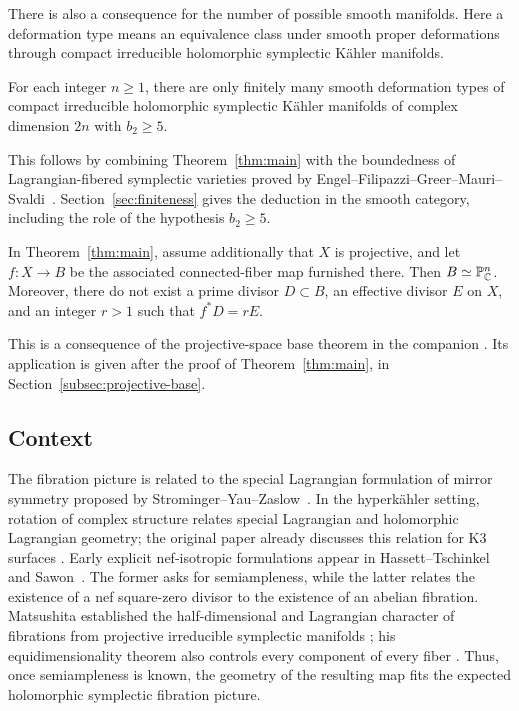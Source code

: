 There is also a consequence for the number of possible smooth
manifolds. Here a deformation type means an equivalence class
under smooth proper deformations through compact irreducible
holomorphic symplectic K\"ahler manifolds.

\begin{corollary}\label{cor:finiteness}
For each integer $n\ge1$, there are only finitely many smooth
deformation types of compact irreducible holomorphic symplectic
K\"ahler manifolds of complex dimension $2n$ with $b_2\ge5$.
\end{corollary}

This follows by combining Theorem~\ref{thm:main} with the boundedness
of Lagrangian-fibered symplectic varieties proved by
Engel--Filipazzi--Greer--Mauri--Svaldi~\cite{EFGMS}.
Section~\ref{sec:finiteness} gives the deduction in the smooth
category, including the role of the hypothesis $b_2\ge5$.

\begin{corollary}\label{cor:projective-base}
In Theorem~\ref{thm:main}, assume additionally that $X$ is projective,
and let $f:X\to B$ be the associated connected-fiber map furnished there.
Then $B\simeq\mathbb P^n_{\mathbb C}$. Moreover, there do not exist a prime
divisor $D\subset B$, an effective divisor $E$ on $X$, and an integer
$r>1$ such that $f^*D=rE$.
\end{corollary}

This is a consequence of the projective-space base theorem in the
companion \cite[Theorem~1.1 and the following paragraph on
codimension-one multiple fibers]{ProjectiveSpaceBases2026}.
Its application is given after the proof of Theorem~\ref{thm:main},
in Section~\ref{subsec:projective-base}.

\subsection{Context}

The fibration picture is related to the special Lagrangian formulation
of mirror symmetry proposed by Strominger--Yau--Zaslow~\cite{SYZ}.
In the hyperk\"ahler setting, rotation of complex structure relates
special Lagrangian and holomorphic Lagrangian geometry; the original
paper already discusses this relation for K3 surfaces
\cite[Section~4.1]{SYZ}.
Early explicit nef-isotropic formulations appear in
Hassett--Tschinkel~\cite[Remark~3.12]{HassettTschinkel} and
Sawon~\cite[Conjecture~4.1]{Sawon}. The former asks for
semiampleness, while the latter relates the existence of a nef
square-zero divisor to the existence of an abelian fibration.
Matsushita established the
half-dimensional and Lagrangian character of fibrations from
projective irreducible symplectic manifolds
\cite{Matsushita1999,MatsushitaAddendum}; his equidimensionality theorem
also controls every component of every fiber
\cite[Theorem~1]{MatsushitaEquidimensional}.
Thus, once semiampleness is known, the geometry of the resulting map
fits the expected holomorphic symplectic fibration picture.

